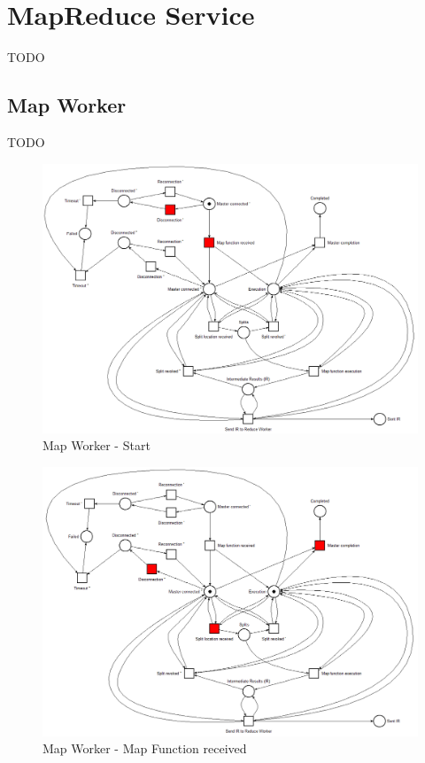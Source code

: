 \section{MapReduce Service}
TODO

\subsection{Map Worker}
TODO

\begin{figure}[!ht]
    \centering
    \includegraphics[width=\linewidth]{document/chapters/chapter_6/images/map_worker_petri_net_1.png}
    \caption{Map Worker - Start}
    \label{fig:map_worker_petri_net_1}
\end{figure}

\begin{figure}[!ht]
    \centering
    \includegraphics[width=\linewidth]{document/chapters/chapter_6/images/map_worker_petri_net_2.png}
    \caption{Map Worker - Map Function received}
    \label{fig:map_worker_petri_net_2}
\end{figure}

